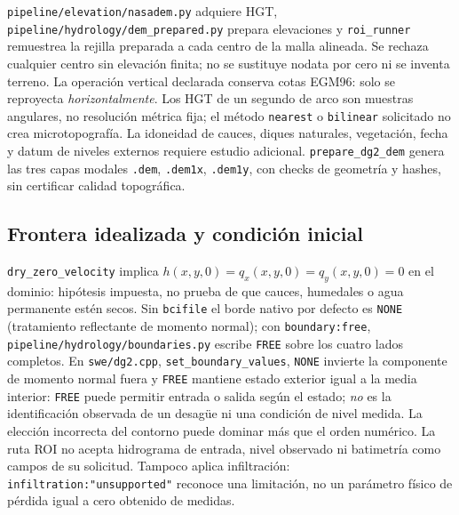 \documentclass[11pt,a4paper]{article}
\newcommand{\src}[1]{\nolinkurl{#1}}
\begin{document}
\src{pipeline/elevation/nasadem.py} adquiere HGT, \src{pipeline/hydrology/dem_prepared.py} prepara elevaciones y \texttt{roi\_runner} remuestrea la rejilla preparada a cada centro de la malla alineada. Se rechaza cualquier centro sin elevación finita; no se sustituye nodata por cero ni se inventa terreno. La operación vertical declarada conserva cotas EGM96: solo se reproyecta \emph{horizontalmente}. Los HGT de un segundo de arco son muestras angulares, no resolución métrica fija; el método \texttt{nearest} o \texttt{bilinear} solicitado no crea microtopografía. La idoneidad de cauces, diques naturales, vegetación, fecha y datum de niveles externos requiere estudio adicional. \texttt{prepare\_dg2\_dem} genera las tres capas modales \texttt{.dem}, \texttt{.dem1x}, \texttt{.dem1y}, con checks de geometría y hashes, sin certificar calidad topográfica.

\subsection{Frontera idealizada y condición inicial}
\texttt{dry\_zero\_velocity} implica $h(x,y,0)=q_x(x,y,0)=q_y(x,y,0)=0$ en el dominio: hipótesis impuesta, no prueba de que cauces, humedales o agua permanente estén secos. Sin \texttt{bcifile} el borde nativo por defecto es \texttt{NONE} (tratamiento reflectante de momento normal); con \texttt{boundary:free}, \src{pipeline/hydrology/boundaries.py} escribe \texttt{FREE} sobre los cuatro lados completos. En \src{swe/dg2.cpp}, \texttt{set\_boundary\_values}, \texttt{NONE} invierte la componente de momento normal fuera y \texttt{FREE} mantiene estado exterior igual a la media interior: \texttt{FREE} puede permitir entrada o salida según el estado; \emph{no} es la identificación observada de un desagüe ni una condición de nivel medida. La elección incorrecta del contorno puede dominar más que el orden numérico. La ruta ROI no acepta hidrograma de entrada, nivel observado ni batimetría como campos de su solicitud. Tampoco aplica infiltración: \texttt{infiltration:"unsupported"} reconoce una limitación, no un parámetro físico de pérdida igual a cero obtenido de medidas.
\end{document}

